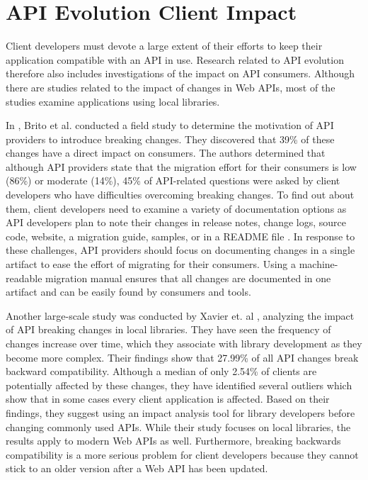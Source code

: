 \section{API Evolution Client Impact}
\label{sec:APIEvolutionClientImpact}

Client developers must devote a large extent of their efforts to keep their application compatible with an API in use. Research related to API evolution therefore also includes investigations of the impact on API consumers. Although there are studies related to the impact of changes in Web APIs, most of the studies examine applications using local libraries.

In \cite{brito_you_2020}, Brito et al. conducted a field study to determine the motivation of API providers to introduce breaking changes. They discovered that 39\% of these changes have a direct impact on consumers. The authors determined that although API providers state that the migration effort for their consumers is low (86\%) or moderate (14\%), 45\% of API-related questions were asked by client developers who have difficulties overcoming breaking changes. To find out about them, client developers need to examine a variety of documentation options as API developers plan to note their changes in release notes, change logs, source code, website, a migration guide, samples, or in a README file \cite{brito_you_2020}. In response to these challenges, API providers should focus on documenting changes in a single artifact to ease the effort of migrating for their consumers. Using a machine-readable migration manual ensures that all changes are documented in one artifact and can be easily found by consumers and tools.

Another large-scale study was conducted by Xavier et. al \cite{xavier_historical_2017}, analyzing the impact of API breaking changes in local libraries. They have seen the frequency of changes increase over time, which they associate with library development as they become more complex. Their findings show that 27.99\% of all API changes break backward compatibility. Although a median of only 2.54\% of clients are potentially affected by these changes, they have identified several outliers which show that in some cases every client application is affected. Based on their findings, they suggest using an impact analysis tool for library developers before changing commonly used APIs. While their study focuses on local libraries, the results apply to modern Web APIs as well. Furthermore, breaking backwards compatibility is a more serious problem for client developers because they cannot stick to an older version after a Web API has been updated.

